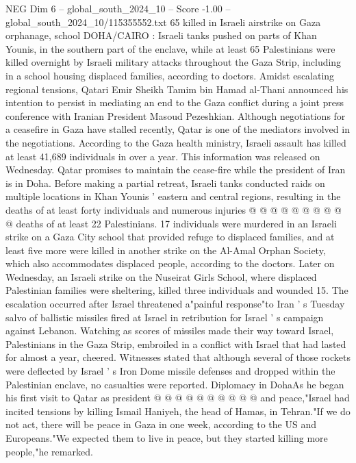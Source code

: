 \begin{textsample}{NEG Dim 6 – global\_south\_2024\_10 – Score -1.00 – global\_south\_2024\_10/115355552.txt}  \label{ex:f6_neg_033}
65 killed in Israeli airstrike on Gaza orphanage, school DOHA/CAIRO : Israeli tanks pushed on parts of Khan Younis, in the southern part of the enclave, while at least 65 Palestinians were killed overnight by Israeli military attacks throughout the Gaza Strip, including in a school housing displaced families, according to doctors.
Amidst escalating regional tensions, Qatari Emir Sheikh Tamim bin Hamad al-Thani announced his intention to persist in mediating an end to the Gaza conflict during a joint press conference with Iranian President Masoud Pezeshkian.
Although negotiations for a ceasefire in Gaza have stalled recently, Qatar is one of the mediators involved in the negotiations.
According to the Gaza health ministry, Israeli assault has killed at least 41,689 individuals in over a year.
This information was released on Wednesday.
Qatar promises to maintain the cease-fire while the president of Iran is in Doha.
Before making a partial retreat, Israeli tanks conducted raids on multiple locations in Khan Younis ' eastern and central regions, resulting in the deaths of at least forty individuals and numerous injuries @ @ @ @ @ @ @ @ @ @ deaths of at least 22 Palestinians. 17 individuals were murdered in an Israeli strike on a Gaza City school that provided refuge to displaced families, and at least five more were killed in another strike on the Al-Amal Orphan Society, which also accommodates displaced people, according to the doctors.
Later on Wednesday, an Israeli strike on the Nuseirat Girls School, where displaced Palestinian families were sheltering, killed three individuals and wounded 15.
The escalation occurred after Israel threatened a"painful response"to Iran ' s Tuesday salvo of ballistic missiles fired at Israel in retribution for Israel ' s campaign against Lebanon.
Watching as scores of missiles made their way toward Israel, Palestinians in the Gaza Strip, embroiled in a conflict with Israel that had lasted for almost a year, cheered.
Witnesses stated that although several of those rockets were deflected by Israel ' s Iron Dome missile defenses and dropped within the Palestinian enclave, no casualties were reported.
Diplomacy in DohaAs he began his first visit to Qatar as president @ @ @ @ @ @ @ @ @ @ and peace,"Israel had incited tensions by killing Ismail Haniyeh, the head of Hamas, in Tehran."If we do not act, there will be peace in Gaza in one week, according to the US and Europeans."We expected them to live in peace, but they started killing more people,"he remarked.

\end{textsample}
